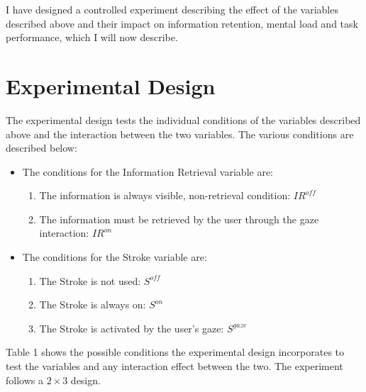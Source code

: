 \documentclass{article}
\begin{document}
I have designed a controlled experiment describing the effect of the variables described above and their impact on information retention, mental load and task performance, which I will now describe.

\section{Experimental Design} \label{Evidence}
The experimental design tests the individual conditions of the variables described above and the interaction between the two variables. The various conditions are described below:
\begin{itemize}
\item The conditions for the Information Retrieval variable are: 
	\begin{enumerate}
	\item The information is always visible, non-retrieval condition: $IR^{ off}$
    \item The information must be retrieved by the user through the gaze interaction: $IR^{ on}$ 
	\end{enumerate}
\item The conditions for the Stroke variable are:
	\begin{enumerate}
	\item The Stroke is not used: $S^{ off}$
    \item The Stroke is always on: $S^{ on}$
    \item The Stroke is activated by the user's gaze: $S^{ gaze}$
	\end{enumerate}
\end{itemize}
Table 1 shows the possible conditions the experimental design incorporates to test the variables and any interaction effect between the two. The experiment follows a $2\times3$ design. 
\end{document}
